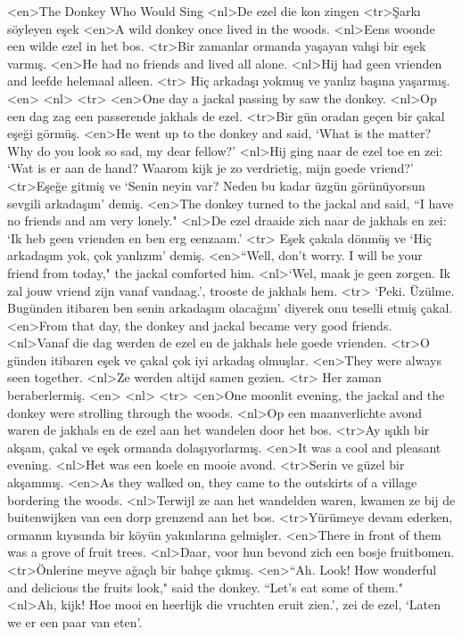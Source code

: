 <en>The Donkey Who Would Sing 
<nl>De ezel die kon zingen
<tr>Şarkı söyleyen eşek 
<en>A wild donkey once lived in the woods. 
<nl>Eens woonde een wilde ezel in het bos.
<tr>Bir zamanlar ormanda yaşayan vahşi bir eşek varmış.
<en>He had no friends and lived all alone. 
<nl>Hij had geen vrienden and leefde helemaal alleen.
<tr> Hiç arkadaşı yokmuş ve yanlız başına yaşarmış.
<en>
<nl>
<tr>
<en>One day a jackal passing by saw the donkey. 
<nl>Op een dag zag een passerende jakhals de ezel.
<tr>Bir gün oradan geçen bir çakal eşeği görmüş.
<en>He went up to the donkey and said, `What is the matter? Why do you look so sad, my dear fellow?' 
<nl>Hij ging naar de ezel toe en zei: `Wat is er aan de hand? Waarom kijk je zo verdrietig, mijn goede vriend?'
<tr>Eşeğe gitmiş ve `Senin neyin var? Neden bu kadar üzgün görünüyorsun sevgili arkadaşım' demiş.
<en>The donkey turned to the jackal and said, “I have no friends and am very lonely." 
<nl>De ezel draaide zich naar de jakhals en zei: `Ik heb geen vrienden en ben erg eenzaam.'
<tr> Eşek çakala dönmüş ve `Hiç arkadaşım yok, çok yanlızım' demiş.
<en>“Well, don't worry. I will be your friend from today," the jackal comforted him. 
<nl>`Wel, maak je geen zorgen. Ik zal jouw vriend zijn vanaf vandaag.', trooste de jakhals hem.
<tr> `Peki. Üzülme. Bugünden itibaren ben senin arkadaşım olacağım' diyerek onu teselli etmiş çakal.
<en>From that day, the donkey and jackal became very good friends. 
<nl>Vanaf die dag werden de ezel en de jakhals hele goede vrienden.
<tr>O günden itibaren eşek ve çakal çok iyi arkadaş olmuşlar.
<en>They were always seen together. 
<nl>Ze werden altijd samen gezien.
<tr> Her zaman beraberlermiş.
<en>
<nl>
<tr>
<en>One moonlit evening, the jackal and the donkey were strolling through the woods. 
<nl>Op een maanverlichte avond waren de jakhals en de ezel aan het wandelen door het bos.
<tr>Ay ışıklı bir akşam, çakal ve eşek ormanda dolaşıyorlarmış.
<en>It was a cool and pleasant evening. 
<nl>Het was een koele en mooie avond.
<tr>Serin ve güzel bir akşammış.
<en>As they walked on, they came to the outskirts of a village bordering the woods. 
<nl>Terwijl ze aan het wandelden waren, kwamen ze bij de buitenwijken van een dorp grenzend aan het bos.
<tr>Yürümeye devam ederken, ormanın kıyısında bir köyün yakınlarına gelmişler.
<en>There in front of them was a grove of fruit trees. 
<nl>Daar, voor hun bevond zich een bosje fruitbomen.
<tr>Önlerine meyve ağaçlı bir bahçe çıkmış.
<en>“Ah. Look! How wonderful and delicious the fruits look," said the donkey. “Let’s eat some of them." 
<nl>Ah, kijk! Hoe mooi en heerlijk die vruchten eruit zien.', zei de ezel, `Laten we er een paar van eten'.
